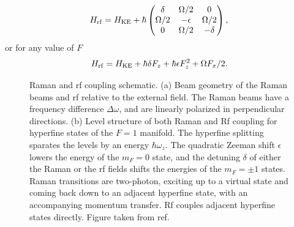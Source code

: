 \begin{equation}
H_{\rm rf} = H_{\rm KE} + \hbar
 \begin{pmatrix} \delta & \Omega/2  &  0  \\ 
\Omega/2 & -\epsilon &  \Omega/2 \\
 0 & \Omega/2  & -\delta  \\
 \end{pmatrix} \\,
\label{eqn:rfHam}
\end{equation}
or for any value of $F$
\begin{equation}
H_{\rm rf} = H_{\rm KE} + \hbar\delta F_z + \hbar \epsilon F^2_z + \Omega F_x/2.
\end{equation}

\begin{figure}
\caption{Raman and rf coupling schematic. (a) Beam geometry of the Raman beams and rf relative to the external field. The Raman beams have a frequency difference $\Delta\omega$, and are linearly polarized in perpendicular directions. (b) Level structure of both Raman and Rf coupling for hyperfine states of the $F=1$ manifold. The hyperfine splitting sparates  the levels by an energy $\hbar\omega_z$. The quadratic Zeeman shift $\epsilon$ lowers the energy of the $m_F=0$ state, and the detuning $\delta$ of either the Raman or the rf fields shifts the energies of the $m_F=\pm1$ states. Raman transitions are two-photon, exciting up to a virtual state and coming back down to an adjacent hyperfine state, with an accompanying momentum transfer. Rf couples adjacent hyperfine states directly. Figure taken from ref. \cite{Karina2012}}
\label{fig:RamanRfSchematic}
\end{figure}


